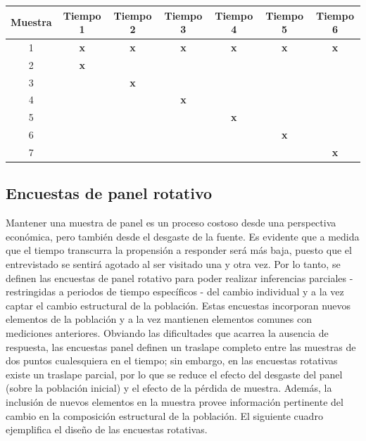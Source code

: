 \documentclass[
  12pt,
  spanish,
]{book}
\begin{document}
\begin{longtable}[]{@{}ccccccc@{}}
\toprule
Muestra & Tiempo 1 & Tiempo 2 & Tiempo 3 & Tiempo 4 & Tiempo 5 & Tiempo 6 \\
\midrule
\endhead
1 & \textbf{x} & \textbf{x} & \textbf{x} & \textbf{x} & \textbf{x} & \textbf{x} \\
2 & \textbf{x} & & & & & \\
3 & & \textbf{x} & & & & \\
4 & & & \textbf{x} & & & \\
5 & & & & \textbf{x} & & \\
6 & & & & & \textbf{x} & \\
7 & & & & & & \textbf{x} \\
\bottomrule
\end{longtable}

\hypertarget{encuestas-de-panel-rotativo}{%
\subsection{Encuestas de panel rotativo}\label{encuestas-de-panel-rotativo}}

Mantener una muestra de panel es un proceso costoso desde una perspectiva económica, pero también desde el desgaste de la fuente. Es evidente que a medida que el tiempo transcurra la propensión a responder será más baja, puesto que el entrevistado se sentirá agotado al ser visitado una y otra vez. Por lo tanto, se definen las encuestas de panel rotativo para poder realizar inferencias parciales - restringidas a periodos de tiempo específicos - del cambio individual y a la vez captar el cambio estructural de la población. Estas encuestas incorporan nuevos elementos de la población y a la vez mantienen elementos comunes con mediciones anteriores. Obviando las dificultades que acarrea la ausencia de respuesta, las encuestas panel definen un traslape completo entre las muestras de dos puntos cualesquiera en el tiempo; sin embargo, en las encuestas rotativas existe un traslape parcial, por lo que se reduce el efecto del desgaste del panel (sobre la población inicial) y el efecto de la pérdida de muestra. Además, la inclusión de nuevos elementos en la muestra provee información pertinente del cambio en la composición estructural de la población. El siguiente cuadro ejemplifica el diseño de las encuestas rotativas.
\end{document}
